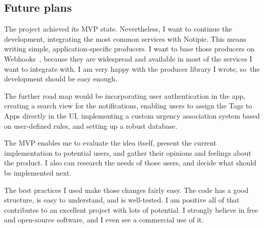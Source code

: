 \subsection{Future plans}\label{sec:future-plans}

The project achieved its \ac{MVP} state.
Nevertheless, I want to continue the development,
integrating the most common services
with Notipie.
This means writing simple,
application-specific producers.
I want to base those producers on Webhooks~\cite{lindsay_web_2007},
because they are widespread
and available in most of the services
I want to integrate with.
I am very happy with the producer library I wrote,
so~the development should be easy enough.

The further road map would be
incorporating user authentication in the app,
creating a search view for the notifications,
enabling users to assign the Tags to Apps
directly in the \ac{UI},
implementing a custom urgency association system
based on user-defined rules,
and setting up a robust database.

The \ac{MVP} enables me to evaluate the idea itself,
present the current implementation to potential users,
and gather their opinions and feelings about the product.
I also can research the needs of those users,
and decide what should be implemented next.

The best practices I used make those changes
fairly easy.
The code has a good structure,
is easy to understand,
and is well-tested.
I am positive all of that contributes
to an excellent project
with lots of potential.
I strongly believe in
free and open-source software,
and I even see a commercial use of it.
